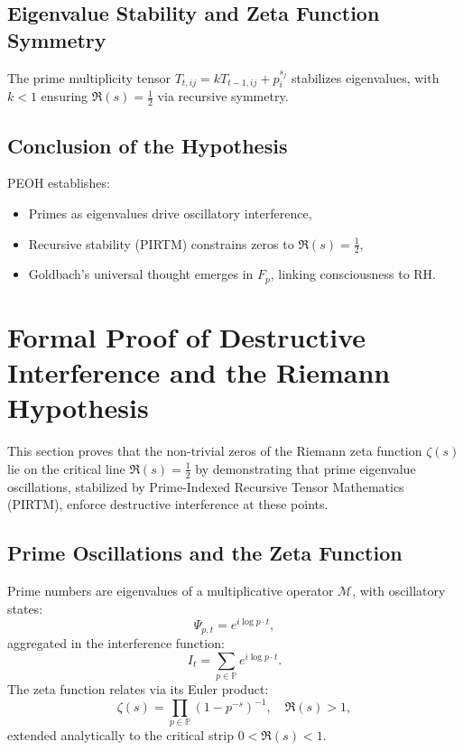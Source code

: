 \documentclass[11pt]{article}
\theoremstyle{plain}
\begin{document}
\subsection{Eigenvalue Stability and Zeta Function Symmetry}
The prime multiplicity tensor \( T_{t,ij} = k T_{t-1,ij} + p_i^{s_j} \) stabilizes eigenvalues, with \( k < 1 \) ensuring \( \Re(s) = \frac{1}{2} \) via recursive symmetry.

\subsection{Conclusion of the Hypothesis}
PEOH establishes:
\begin{itemize}
    \item Primes as eigenvalues drive oscillatory interference,
    \item Recursive stability (PIRTM) constrains zeros to \( \Re(s) = \frac{1}{2} \),
    \item Goldbach’s universal thought emerges in \( F_p \), linking consciousness to RH.
\end{itemize}
\section{Formal Proof of Destructive Interference and the Riemann Hypothesis}
\label{sec:formal_proof}

This section proves that the non-trivial zeros of the Riemann zeta function \( \zeta(s) \) lie on the critical line \( \Re(s) = \frac{1}{2} \) by demonstrating that prime eigenvalue oscillations, stabilized by Prime-Indexed Recursive Tensor Mathematics (PIRTM), enforce destructive interference at these points.

\subsection{Prime Oscillations and the Zeta Function}
Prime numbers are eigenvalues of a multiplicative operator \( \mathcal{M} \), with oscillatory states:
\begin{equation}
    \Psi_{p,t} = e^{i \log p \cdot t},
\end{equation}
aggregated in the interference function:
\begin{equation}
    I_t = \sum_{p \in \mathbb{P}} e^{i \log p \cdot t}.
\end{equation}
The zeta function relates via its Euler product:
\begin{equation}
    \zeta(s) = \prod_{p \in \mathbb{P}} (1 - p^{-s})^{-1}, \quad \Re(s) > 1,
\end{equation}
extended analytically to the critical strip \( 0 < \Re(s) < 1 \).
\end{document}
